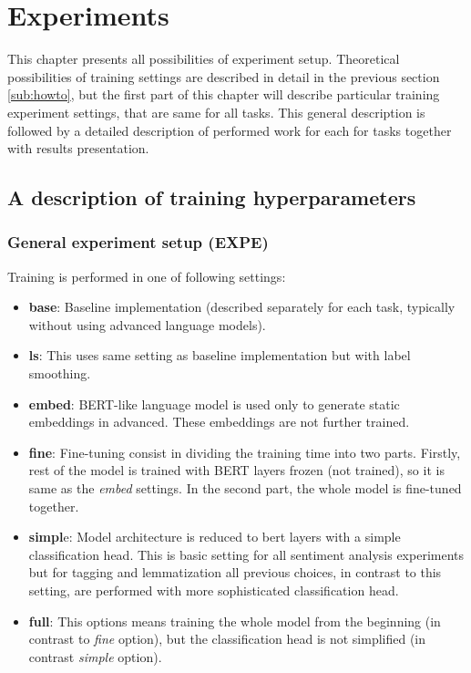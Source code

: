 \chapter{Experiments}
This chapter presents all possibilities of experiment setup. Theoretical possibilities of training settings are described in detail in the previous section \ref{sub:howto}, but the first part of this chapter will describe particular training experiment settings, that are same for all tasks. This general description is followed by a detailed description of performed work for each for tasks together with results presentation.
\section{A description of training hyperparameters}
\subsection{General experiment setup (EXPE)}
Training is performed in one of following settings:
\begin{itemize}
\item \textbf{base}: Baseline implementation (described separately for each task, typically without using advanced language models).
\item \textbf{ls}: This uses same setting as baseline implementation but with label smoothing.
\item \textbf{embed}: BERT-like language model is used only to generate static embeddings in advanced. These embeddings are not further trained.
\item \textbf{fine}: Fine-tuning consist in dividing the training time into two parts. Firstly, rest of the model is trained with BERT layers frozen (not trained), so it is same as the \textit{embed} settings. In the second part, the whole model is fine-tuned together.
\item \textbf{simpl}e: Model architecture is reduced to bert layers with a simple classification head. This is basic setting for all sentiment analysis experiments but for tagging and lemmatization all previous choices, in contrast to this setting, are performed with more sophisticated classification head.
\item \textbf{full}: This options means training the whole model from the beginning (in contrast to \textit{fine} option), but the classification head is not simplified (in contrast \textit{simple} option).
\end{itemize}
